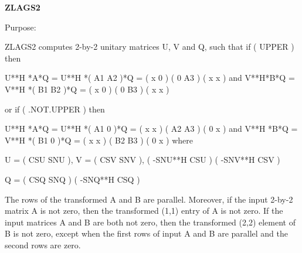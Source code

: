 {\bfseries Z\+L\+A\+G\+S2} 

 \begin{DoxyParagraph}{Purpose\+: }
\begin{DoxyVerb} ZLAGS2 computes 2-by-2 unitary matrices U, V and Q, such
 that if ( UPPER ) then

           U**H *A*Q = U**H *( A1 A2 )*Q = ( x  0  )
                             ( 0  A3 )     ( x  x  )
 and
           V**H*B*Q = V**H *( B1 B2 )*Q = ( x  0  )
                            ( 0  B3 )     ( x  x  )

 or if ( .NOT.UPPER ) then

           U**H *A*Q = U**H *( A1 0  )*Q = ( x  x  )
                             ( A2 A3 )     ( 0  x  )
 and
           V**H *B*Q = V**H *( B1 0  )*Q = ( x  x  )
                             ( B2 B3 )     ( 0  x  )
 where

   U = (   CSU    SNU ), V = (  CSV    SNV ),
       ( -SNU**H  CSU )      ( -SNV**H CSV )

   Q = (   CSQ    SNQ )
       ( -SNQ**H  CSQ )

 The rows of the transformed A and B are parallel. Moreover, if the
 input 2-by-2 matrix A is not zero, then the transformed (1,1) entry
 of A is not zero. If the input matrices A and B are both not zero,
 then the transformed (2,2) element of B is not zero, except when the
 first rows of input A and B are parallel and the second rows are
 zero.\end{DoxyVerb}
 
\end{DoxyParagraph}

